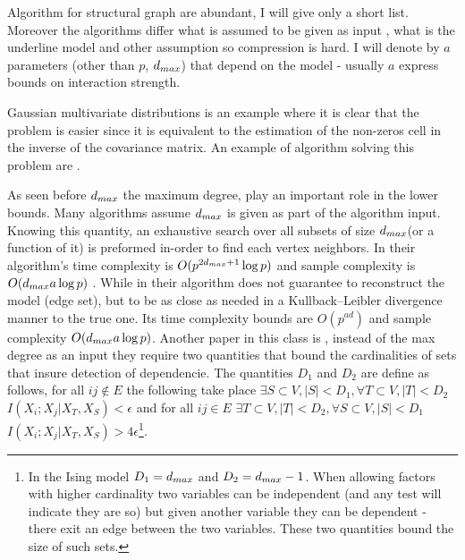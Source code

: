 Algorithm for structural graph are abundant, I will give only a short list.
Moreover the algorithms differ what is assumed to be given as input , what is the underline model and other assumption so compression is hard.
I will denote by $a$ parameters (other than $p$, $d_{max}$) that depend on the model - usually $a$ express bounds on interaction strength.

Gaussian multivariate distributions  is an example where it is clear that the problem is easier since it  is equivalent to the estimation of the non-zeros cell in the inverse of the covariance matrix. An example of algorithm solving this problem are \cite{meinshausen2006high,yuan2007model, friedman2008sparse}. 

As seen before $d_{max}$ the maximum degree, play an important role in the lower bounds. Many algorithms \cite{bresler2008reconstruction, abbeel2006learning} assume  $d_{max}$ is given as  part of the algorithm input. Knowing this quantity, an exhaustive search over all subsets of size $d_{max}$(or a function of it) is preformed in-order to find each vertex neighbors.  In\cite{bresler2008reconstruction} their algorithm's time complexity is $O(p^{2d_{max}+1}\log p)$ and sample complexity is $O(d_{max} a \log p)$ . While in \cite{abbeel2006learning} their algorithm does not guarantee to reconstruct the model (edge set), but to be as close as needed in a Kullback–Leibler divergence manner to the true one. Its time complexity bounds are $O(p^{a d})$ and sample complexity $O(d_{max} a \log p)$. Another paper in this class is \cite{wu2013learning},  instead of the max degree as an input they require two quantities that bound the cardinalities of sets that insure detection of dependencie. 
The quantities $D_1$ and $D_2$ are define as follows, for all  $ij \not \in E$ the following take place $\exists S \subset V, |S|< D_1, \forall T \subset V, |T|<D_2$ $I(X_i;X_j | X_T, X_S)<\epsilon$ and for all $ij \in E$ $\exists T \subset V, |T|< D_2, \forall S \subset V, |S|<D_1$ $I(X_i;X_j | X_T, X_S)>4\epsilon$\footnote{In the Ising model $D_1 = d_{max}$ and $D_2 = d_{max} -1$. When allowing factors with higher cardinality two variables can be independent (and any test will indicate they are so) but given another variable they can be dependent - there exit an edge between the two variables. These two quantities bound the size of such sets. }. 

